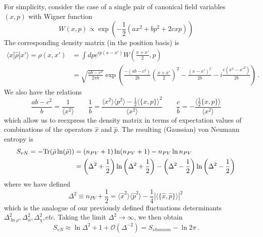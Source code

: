 \documentclass[11pt,a4paper]{article}
\begin{document}
For simplicity, consider the case of a single pair of canonical field variables $(x,p)$ with Wigner function
\begin{equation}
  W(x,p) \propto \exp\left(-\frac{1}{2}\left(ax^2 + bp^2 + 2cxp\right)\right)
\end{equation}
The corresponding density matrix (in the position basis) is
\begin{align}
  \langle x|\hat{\rho}|x'\rangle =\rho(x,x') &= \int dp e^{ip(x-x')}W\left(\frac{x+x'}{2},p\right) \\
  &= \sqrt{\frac{ab-c^2}{2\pi b}}\exp\left(\frac{-(ab-c^2)}{2b}\left(\frac{x+x'}{2}\right)^2 - \frac{(x-x')^2}{2b} - i\frac{c(x^2-x'^2)}{2b}\right) \, .
\end{align}
We also have the relations
\begin{equation}
  \frac{ab-c^2}{b} = \frac{1}{\langle x^2\rangle} \qquad \frac{1}{b} = \frac{\langle x^2\rangle\langle p^2\rangle - \frac{1}{2}\langle \{x,p\}\rangle^2}{\langle x^2\rangle} \qquad \frac{c}{b} = -\frac{\langle \frac{1}{2}\{x,p\} \rangle}{\langle x^2\rangle}
\end{equation}
which allow us to reexpress the density matrix in terms of expectation values of combinations of the operators $\hat{x}$ and $\hat{p}$.
The resulting (Gaussian) von Neumann entropy is
\begin{align}
  S_{vN} = -\mathrm{Tr}(\bar{\rho}\ln(\bar{\rho})) &= (n_{PV}+1)\ln(n_{PV}+1) - n_{PV}\ln n_{PV} \\
  &= \left(\Delta^2 + \frac{1}{2}\right)\ln\left(\Delta^2+\frac{1}{2}\right) -\left(\Delta^2 - \frac{1}{2}\right)\ln\left(\Delta^2-\frac{1}{2}\right) \notag
\end{align}
where we have defined
\begin{equation}
 \Delta^2 \equiv n_{PV} + \frac{1}{2} = \langle\hat{x}^2\rangle\langle\hat{p}^2\rangle - \frac{1}{4}|\langle\{\hat{x},\hat{p}\}\rangle|^2 \,
\end{equation}
which is the analogue of our previously defined fluctuations determinants $\Delta^2_{\ln\rho},\Delta^2_\phi,\Delta^2_\chi$,\emph{etc.}
Taking the limit $\Delta^2 \to \infty$, we then obtain
\begin{equation}
  S_{vN} \approx \ln\Delta^2 + 1 + \mathcal{O}(\Delta^{-2}) = S_{shannon} - \ln 2\pi \, . 
\end{equation}
\end{document}
